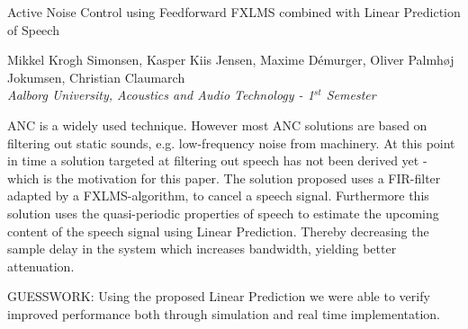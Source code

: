 
\begin{center}
\begin{huge}
Active Noise Control using Feedforward FXLMS combined with Linear Prediction of Speech
\end{huge}

\vspace{5mm}
Mikkel Krogh Simonsen, Kasper Kiis Jensen, Maxime Démurger, Oliver Palmhøj Jokumsen, Christian Claumarch
\\
\textit{Aalborg University, Acoustics and Audio Technology - 1$^{st}$ Semester}


\vspace{5mm}

ANC is a widely used technique. However most ANC solutions are based on filtering out static sounds, e.g. low-frequency noise from machinery. At this point in time a solution targeted at filtering out speech has not been derived yet - which is the motivation for this paper.
The solution proposed uses a FIR-filter adapted by a FXLMS-algorithm, to cancel a speech signal. Furthermore this solution uses the quasi-periodic properties of speech to estimate the upcoming content of the speech signal using Linear Prediction. Thereby decreasing the sample delay in the system which increases bandwidth, yielding better attenuation.




GUESSWORK: Using the proposed Linear Prediction we were able to verify improved performance both through simulation and real time implementation.












\end{center}